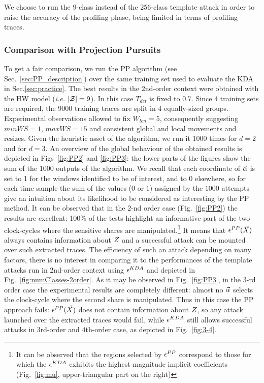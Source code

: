 \begin{remark}
We choose to run the $9$-class instead of the $256$-class template attack in order to raise the accuracy of the profiling phase, being limited in terms of profiling traces. 
\end{remark}


\subsubsection{Comparison with Projection Pursuits}\label{sec:comparisonPP}

To get a fair comparison, we run the PP algorithm (see Sec.~\ref{sec:PP_description}) over the same training set used to evaluate the KDA in Sec.\ref{sec:practice}. The best results in the $2$nd-order context were obtained with the HW model (\emph{i.e.}  $\lvert \mathcal{Z} \rvert=9$). In this case $T_{det}$ is fixed to $0.7$. Since 4 training sets are required, the 9000 training traces are split in 4 equally-sized groups.  Experimental observations allowed to fix  $W_{len}=5$, consequently suggesting $minWS=1$, $maxWS = 15$ and consistent global and local movements and resizes.
 Given the heuristic asset of the algorithm, we run it 1000 times for $d=2$ and for $d=3$. An overview of the global behaviour of the obtained results is depicted in Figs~\ref{fig:PP2} and \ref{fig:PP3}: the lower parts of the figures show the sum of the 1000 outputs of the algorithm.
  We recall that each coordinate of $\vec{\alpha}$ is set to 1 for the windows identified to be of interest, and to 0 elsewhere, so for each time sample the sum of the values ($0$ or $1$) assigned by the $1000$ attempts give an intuition about its likelihood to be considered as interesting by the PP method. It can be observed that in the $2$-nd order case (Fig.~\ref{fig:PP2}) the results are excellent: 100\% of the tests highlight an informative part of the two clock-cycles where the sensitive shares are manipulated.\footnote{It can be observed that the regions selected by $\epsilon^{PP}$ correspond to those for which the $\epsilon^{KDA}$ exhibits the highest magnitude implicit coefficients (Fig.~\ref{fig:mu}, upper-triangular part on the right)}
It means that $\epsilon^{PP}(\vec{X})$ always contains information about $Z$ and a successful attack can be mounted over such extracted traces. The efficiency of such an attack depending on many factors, there is no interest in comparing it to the performances of the template attacks run in $2$nd-order context using $\epsilon^{KDA}$ and depicted in Fig.~\ref{fig:numClasses-2order}.
As it may be observed in Fig.~\ref{fig:PP3}, in the $3$-rd order case the experimental results are completely different: almost no $\vec{\alpha}$ selects the clock-cycle where the second share is manipulated. Thus in this case the PP approach fails: $\epsilon^{PP}(\vec{X})$ does not contain information about $Z$, so any attack launched over the extracted traces would fail, while $\epsilon^{KDA}$ still allows successful attacks in $3$rd-order and $4$th-order case, as depicted in Fig.~\ref{fig:3-4}.\\

